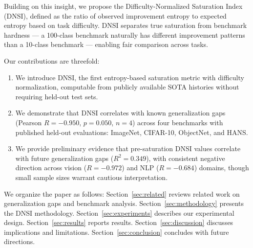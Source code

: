 Building on this insight, we propose the Difficulty-Normalized Saturation Index (DNSI), defined as the ratio of observed improvement entropy to expected entropy based on task difficulty. DNSI separates true saturation from benchmark hardness --- a 100-class benchmark naturally has different improvement patterns than a 10-class benchmark --- enabling fair comparison across tasks.

Our contributions are threefold:
\begin{enumerate}
    \item We introduce DNSI, the first entropy-based saturation metric with difficulty normalization, computable from publicly available SOTA histories without requiring held-out test sets.
    \item We demonstrate that DNSI correlates with known generalization gaps (Pearson $R = -0.950$, $p = 0.050$, $n=4$) across four benchmarks with published held-out evaluations: ImageNet, CIFAR-10, ObjectNet, and HANS.
    \item We provide preliminary evidence that pre-saturation DNSI values correlate with future generalization gaps ($R^2 = 0.349$), with consistent negative direction across vision ($R = -0.972$) and NLP ($R = -0.684$) domains, though small sample sizes warrant cautious interpretation.
\end{enumerate}

We organize the paper as follows: Section~\ref{sec:related} reviews related work on generalization gaps and benchmark analysis. Section~\ref{sec:methodology} presents the DNSI methodology. Section~\ref{sec:experiments} describes our experimental design. Section~\ref{sec:results} reports results. Section~\ref{sec:discussion} discusses implications and limitations. Section~\ref{sec:conclusion} concludes with future directions.
